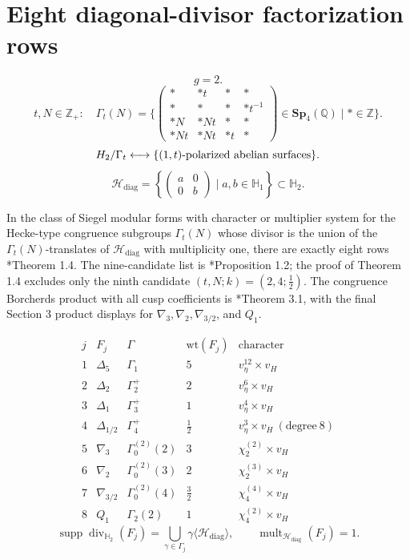 \documentclass[11pt]{memoir}
\newcommand{\Sp}{\mathbf{Sp}}
\begin{document}
\section{Eight diagonal-divisor factorization rows}

$$g=2.$$
$$t,N \in \mathbb{Z}_+:\quad \Gamma_t(N) =
\{\begin{pmatrix}*&*t&*&*\\*&*&*&*t^{-1}\\*N&*Nt&*&*\\*Nt&*Nt&*t&*\end{pmatrix}
\in \Sp_4(\mathbb{Q})\mid *\in\mathbb{Z}\}.$$
$$\mathbb H_2/\Gamma_t
\longleftrightarrow\{(1,t)\hbox{-polarized abelian surfaces}\}.$$
$$\mathcal H_{\mathrm{diag}}
=\left\{\begin{pmatrix}a&0\\0&b\end{pmatrix}\mid
a,b\in\mathbb{H}_1\right\}\subset\mathbb{H}_2.$$

\begin{theorem}
In the class of Siegel modular forms with character or multiplier system
for the Hecke-type congruence subgroups $\Gamma_t(N)$ whose divisor is
the union of the $\Gamma_t(N)$-translates of $\mathcal H_{\mathrm{diag}}$
with multiplicity one, there are exactly eight rows
\cite{GC}*{Theorem 1.4}.  The nine-candidate list is
\cite{GC}*{Proposition 1.2}; the proof of Theorem 1.4 excludes only
the ninth candidate \((t,N;k)=(2,4;\frac12)\).  The congruence
Borcherds product with all
cusp coefficients is \cite{GC}*{Theorem 3.1}, with the final Section 3
product displays for $\nabla_3,\nabla_2,\nabla_{3/2}$, and $Q_1$.
\end{theorem}

$$
\begin{array}{c|c|c|c|c}
j&F_j&\Gamma&\mathrm{wt}(F_j)&\mathrm{character}\\ \hline
1&\Delta_5&\Gamma_1&5&v_\eta^{12}\times v_H\\
2&\Delta_2&\Gamma_2^+&2&v_\eta^{6}\times v_H\\
3&\Delta_1&\Gamma_3^+&1&v_\eta^{4}\times v_H\\
4&\Delta_{1/2}&\Gamma_4^+&\frac12&v_\eta^{3}\times v_H\ (\mathrm{degree}\ 8)\\
5&\nabla_3&\Gamma_0^{(2)}(2)&3&\chi_2^{(2)}\times v_H\\
6&\nabla_2&\Gamma_0^{(2)}(3)&2&\chi_2^{(3)}\times v_H\\
7&\nabla_{3/2}&\Gamma_0^{(2)}(4)&\frac32&\chi_4^{(4)}\times v_H\\
8&Q_1&\Gamma_2(2)&1&\chi_4^{(2)}\times v_H
\end{array}
$$
$$\operatorname{supp}\operatorname{div}_{\mathbb H_2}(F_j)
=\bigcup_{\gamma\in\Gamma_j}\gamma\langle\mathcal H_{\mathrm{diag}}\rangle,
\qquad
\operatorname{mult}_{\mathcal H_{\mathrm{diag}}}(F_j)=1.$$
\end{document}
